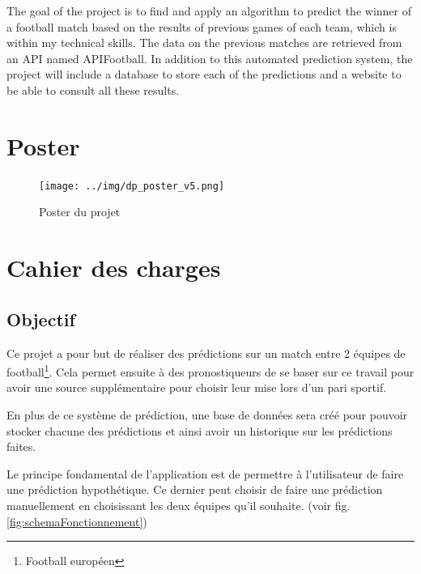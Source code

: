 \documentclass[a4paper,14pt]{extarticle}
\begin{document}
{The goal of the project is to find and apply an algorithm to predict the winner of a football match based on the results of previous games of each team, which is within my technical skills. The data on the previous matches are retrieved from an API named APIFootball. In addition to this automated prediction system, the project will include a database to store each of the predictions and a website to be able to consult all these results.

\newpage

\section{Poster}

\begin{figure}[htp]
    \centering
    \texttt{[image: ../img/dp\_poster\_v5.png]}
    \caption{Poster du projet}
    \label{fig:poster}
\end{figure}

\section{Cahier des charges}

\subsection{Objectif}

Ce projet a pour but de réaliser des prédictions sur un match entre 2 équipes de football\footnote{Football européen}. Cela permet ensuite à des pronostiqueurs de se baser sur ce travail pour avoir une source supplémentaire pour choisir leur mise lors d'un pari sportif. 

En plus de ce système de prédiction, une base de données sera créé pour pouvoir stocker chacune des prédictions et ainsi avoir un historique sur les prédictions faites. 

Le principe fondamental de l'application est de permettre à l'utilisateur de faire une prédiction hypothétique. Ce dernier peut choisir de faire une prédiction manuellement en choisissant les deux équipes qu'il souhaite. (voir fig. \ref{fig:schemaFonctionnement})

}
\end{document}
